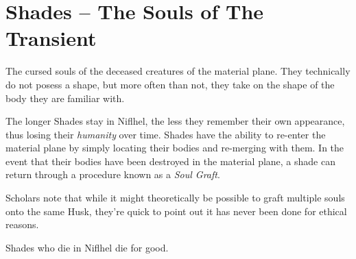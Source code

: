 \section{Shades -- The Souls of The Transient}\label{sec:shade}
The cursed souls of the deceased creatures of the material plane.
They technically do not posess a shape, but more often than not, they take on the shape of the body they are familiar with.

The longer Shades stay in Niflhel, the less they remember their own appearance, thus losing their \textit{humanity} over time.
Shades have the ability to re-enter the material plane by simply locating their bodies and re-merging with them.
In the event that their bodies have been destroyed in the material plane, a shade can return through a procedure known as a \textit{Soul Graft}.

Scholars note that while it might theoretically be possible to graft multiple souls onto the same Husk, they're quick to point out it has never been done for ethical reasons.

Shades who die in Niflhel die for good.
